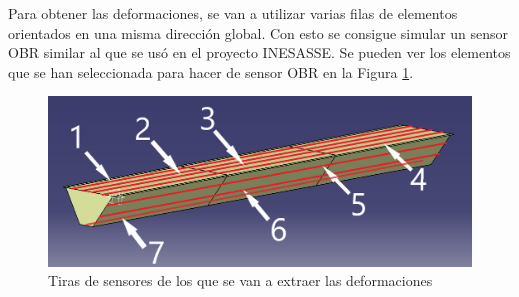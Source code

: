 Para obtener las deformaciones, se van a utilizar varias filas de elementos orientados en una misma dirección global. Con esto se consigue simular un sensor OBR similar al que se usó en el proyecto INESASSE. Se pueden ver los elementos que se han seleccionada para hacer de sensor OBR en la Figura \ref{fig:sensors}.

\begin{figure}[h!]
    \centering
    \includegraphics[width=150mm]{3/Fotos/Sensors.png}
    \captionsetup{justification=centering,margin=1.25cm}
    \caption{Tiras de sensores de los que se van a extraer las deformaciones}
    \label{fig:sensors}
\end{figure}  












	



    
    
    
